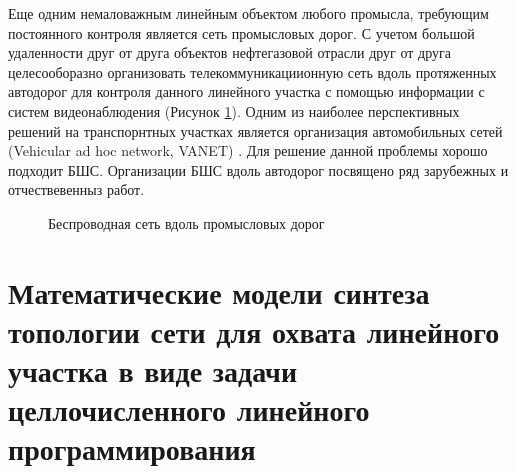 Еще одним немаловажным линейным объектом любого промысла, требующим постоянного контроля является сеть промысловых дорог. С учетом большой удаленности друг от друга объектов нефтегазовой отрасли друг от друга целесооборазно организовать телекоммуникациионную сеть вдоль протяженных автодорог для контроля данного линейного участка с помощью информации с систем видеонаблюдения \cite{Vish2015} (Рисунок \ref{fig:part2_roadisdeunit}). Одним из наиболее перспективных решений на транспорнтных участках является организация автомобильных сетей (Vehicular ad hoc network, VANET) \cite{Massobrio2020, Campolo2015}. Для решение данной проблемы хорошо подходит БШС. Организации БШС вдоль автодорог посвящено ряд зарубежных и отчествевенныз работ. 

\begin{figure}[ht]
  \caption{Беспроводная сеть вдоль промысловых дорог}\label{fig:part2_roadisdeunit}
\end{figure}





\section{Математические модели синтеза топологии сети для охвата линейного участка в виде задачи целлочисленного линейного программирования}


